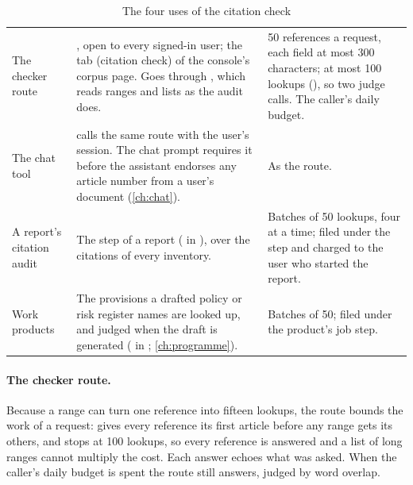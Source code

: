 \begin{table}[H]
\caption{The four uses of the citation check}\label{tab:company:offered}
\begin{tabularx}{\textwidth}{@{}L{29mm}YL{46mm}@{}}
\toprule
{} &  &  \\
\midrule
The checker route &
  , open to every signed-in user; the tab
   (citation check) of the console's corpus page. Goes through
  , which reads ranges and lists as the audit does. &
  50 references a request, each field at most 300 characters; at most 100 lookups
  (), so two judge calls. The caller's daily budget. \\
The chat tool &
   calls the same route with the user's session. The chat prompt
  requires it before the assistant endorses any article number from a user's document
  (\cref{ch:chat}). &
  As the route. \\
A report's citation audit &
  The step  of a report ( in
  ), over the citations of every inventory. &
  Batches of 50 lookups, four at a time; filed under the step and charged to the user who
  started the report. \\
Work products &
  The provisions a drafted policy or risk register names are looked up, and judged when the
  draft is generated ( in ;
  \cref{ch:programme}). &
  Batches of 50; filed under the product's job step. \\
\bottomrule
\end{tabularx}
\end{table}

\paragraph{The checker route.} Because a range can turn one reference into fifteen lookups,
the route bounds the work of a request:  gives every reference its
first article before any range gets its others, and stops at 100 lookups, so every reference
is answered and a list of long ranges cannot multiply the cost. Each answer echoes what was
asked. When the caller's daily budget is spent the route still answers, judged by word
overlap.

